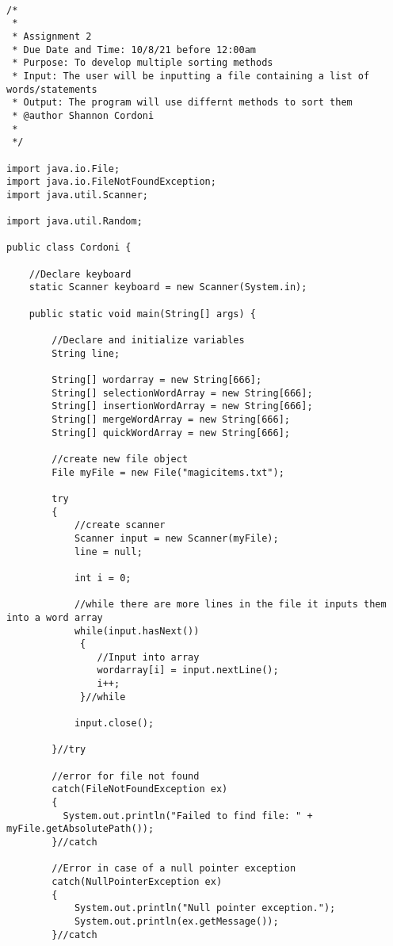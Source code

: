 \documentclass[letterpaper, 10pt,DIV=13]{scrartcl}
\numberwithin{equation}{section} %
\numberwithin{figure}{section} %
\numberwithin{table}{section} %
\begin{document}
\lstset{numbers=left, numberstyle=\tiny, stepnumber=1, numbersep=5pt, basicstyle=\footnotesize\ttfamily}
\begin{lstlisting}[frame=single, ] 
   
/*
 * 
 * Assignment 2
 * Due Date and Time: 10/8/21 before 12:00am 
 * Purpose: To develop multiple sorting methods
 * Input: The user will be inputting a file containing a list of words/statements
 * Output: The program will use differnt methods to sort them 
 * @author Shannon Cordoni 
 * 
 */

import java.io.File;
import java.io.FileNotFoundException;
import java.util.Scanner;

import java.util.Random;

public class Cordoni {

    //Declare keyboard 
    static Scanner keyboard = new Scanner(System.in);
    
    public static void main(String[] args) {

        //Declare and initialize variables 
        String line;
        
        String[] wordarray = new String[666];
        String[] selectionWordArray = new String[666];
        String[] insertionWordArray = new String[666];
        String[] mergeWordArray = new String[666];
        String[] quickWordArray = new String[666];
            
        //create new file object
        File myFile = new File("magicitems.txt");
        
        try
        {
            //create scanner
            Scanner input = new Scanner(myFile);
            line = null;
            
            int i = 0;

            //while there are more lines in the file it inputs them into a word array
            while(input.hasNext())
             {  
                //Input into array 
                wordarray[i] = input.nextLine();        
                i++;
             }//while

            input.close();  

        }//try
        
        //error for file not found
        catch(FileNotFoundException ex)
        {
          System.out.println("Failed to find file: " + myFile.getAbsolutePath()); 
        }//catch

        //Error in case of a null pointer exception
        catch(NullPointerException ex)
        {
            System.out.println("Null pointer exception.");
            System.out.println(ex.getMessage());
        }//catch


\end{lstlisting}
\end{document}
